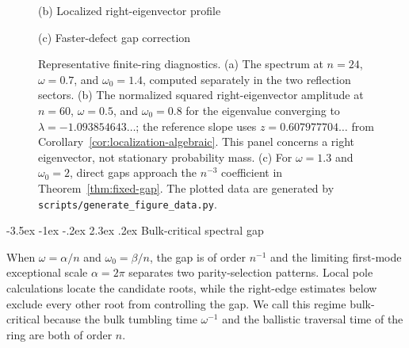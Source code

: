 \documentclass[twoside,10pt]{article}
\makeatletter
\numberwithin{equation}{section}
\theoremstyle{slbody}
\theoremstyle{definition}
\theoremstyle{remark}
\renewcommand{\section}{%
  \@startsection{section}{1}{\z@}%
    {-3.5ex \@plus -1ex \@minus -.2ex}%
    {2.3ex \@plus .2ex}%
    {\normalfont\large\bfseries}}
\makeatother
\begin{document}
\begin{figure}[!t]
\begin{minipage}[t]{0.49\textwidth}
\vspace{-1.5ex}
\centerline{\footnotesize(b) Localized right-eigenvector profile}
\end{minipage}

\vspace{1.2ex}
\begin{minipage}[t]{0.72\textwidth}
\centering
{}

\vspace{-1.5ex}
\centerline{\footnotesize(c) Faster-defect gap correction}
\end{minipage}
\caption{Representative finite-ring diagnostics.  (a) The spectrum at
$n=24$, $\omega=0.7$, and $\omega_0=1.4$, computed separately in the two
reflection sectors.  (b) The normalized squared right-eigenvector amplitude
at $n=60$, $\omega=0.5$, and $\omega_0=0.8$ for the eigenvalue converging to
$\lambda=-1.093854643\ldots$; the reference slope uses
$z=0.607977704\ldots$ from Corollary~\ref{cor:localization-algebraic}.  This
panel concerns a right eigenvector, not stationary probability mass.  (c) For
$\omega=1.3$ and $\omega_0=2$, direct gaps approach the $n^{-3}$ coefficient
in Theorem~\ref{thm:fixed-gap}.  The plotted data are generated by
\texttt{scripts/generate\_figure\_data.py}.}
\label{fig:numerical-summary}
\end{figure}

\section{Bulk-critical spectral gap}\label{sec:critical-gap}

When $\omega=\alpha/n$ and $\omega_0=\beta/n$, the gap is of order
$n^{-1}$ and the limiting first-mode exceptional scale $\alpha=2\pi$
separates two parity-selection patterns.  Local pole calculations locate
the candidate roots, while the right-edge estimates below exclude every
other root from controlling the gap.  We call this regime bulk-critical
because the bulk tumbling time $\omega^{-1}$ and the ballistic traversal
time of the ring are both of order $n$.
\end{document}
